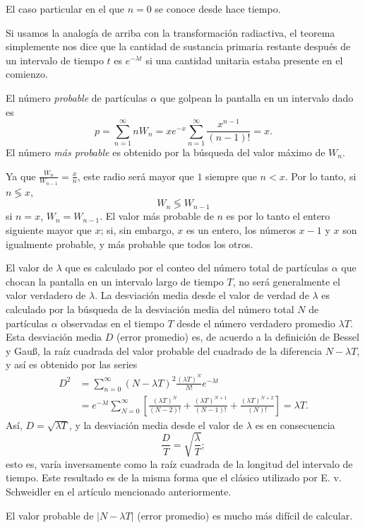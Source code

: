 	El caso particular en el que $n=0$ se conoce desde hace tiempo. %

	Si usamos la analogía de arriba con la transformación radiactiva, el teorema simplemente nos dice que la cantidad de sustancia primaria restante después de un intervalo de tiempo $t$ es $e^{-\lambda t}$ si una cantidad unitaria estaba presente en el comienzo.

	El número \emph{probable} de partículas $\alpha$ que golpean la pantalla en un intervalo dado es
	\[
		p=\sum_{n=1}^{\infty}nW_n=xe^{-x}\sum_{n=1}^{\infty}\frac{x^{n-1}}{\left(n-1\right)!}=x.
	\]
	El número \emph{más probable} es obtenido por la búsqueda del valor máximo de $W_n$.

	Ya que $\frac{W_n}{W_{n-1}}=\frac{x}{n}$, este radio será mayor que $1$ siempre que $n<x$. Por lo tanto, si $n\lessgtr x$,
	\[
		W_n\lessgtr W_{n-1}
	\]
	si $n=x$, $W_n=W_{n-1}$. El valor más probable de $n$ es por lo tanto el entero siguiente mayor que $x$; si, sin embargo, $x$ es un entero, los números $x-1$ y $x$ son igualmente probable, y más probable que todos los otros.

	El valor de $\lambda$ que es calculado por el conteo del número total de partículas $\alpha$ que chocan la pantalla en un intervalo largo de tiempo $T$, no será generalmente el valor verdadero de $\lambda$. La desviación media desde el valor de verdad de $\lambda$ es calculado por la búsqueda de la desviación media del número total $N$ de partículas $\alpha$ observadas en el tiempo $T$ desde el número verdadero promedio $\lambda T$. Esta desviación media $D$ (error promedio) es, de acuerdo a la definición de Bessel y Gau\ss, la raíz cuadrada del valor probable del cuadrado de la diferencia $N-\lambda T$, y así es obtenido por las series %
	\begin{align*}
		D^2
		&=\sum_{n=0}^{\infty}\left(N-\lambda T\right)^2\frac{{\left(\lambda T\right)}^N}{N!}e^{-\lambda t}\\
		&=e^{-\lambda t}\sum_{N=0}^{\infty}\left[\frac{{\left(\lambda T\right)}^N}{\left(N-2\right)!}
		+\frac{{\left(\lambda T\right)}^{N+1}}{\left(N-1\right)!}+\frac{{\left(\lambda T\right)}^{N+2}}{\left(N\right)!}\right]
		=\lambda T.
	\end{align*}
	Así, $D=\sqrt{\lambda T}$, y la desviación media desde el valor de $\lambda$ es en consecuencia
	\[
		\frac{D}{T}=\sqrt{\frac{\lambda}{T}};
	\]
	esto es, varía inversamente como la raíz cuadrada de la longitud del intervalo de tiempo. Este resultado es de la misma forma que el clásico utilizado por E. v. Schweidler en el artículo  mencionado anteriormente.

	El valor probable de $|N-\lambda T|$ (error promedio) es mucho más difícil de calcular.%